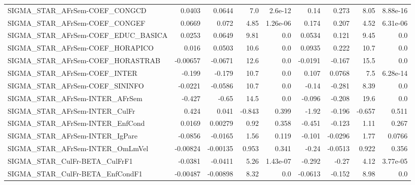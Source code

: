 \begin{tabular}{lrrrrrrrr}
SIGMA\_STAR\_AFrSem-COEF\_CONGCD         &      0.0403 &       0.0644 &     7.0 &  2.6e-12 &       0.14 &       0.273 &         8.05 &      8.88e-16 \\
SIGMA\_STAR\_AFrSem-COEF\_CONGEF         &      0.0669 &        0.072 &    4.85 & 1.26e-06 &      0.174 &       0.207 &         4.52 &      6.31e-06 \\
SIGMA\_STAR\_AFrSem-COEF\_EDUC\_BASICA    &      0.0253 &       0.0649 &    9.81 &      0.0 &     0.0534 &       0.121 &         9.45 &           0.0 \\
SIGMA\_STAR\_AFrSem-COEF\_HORAPICO       &       0.016 &       0.0503 &    10.6 &      0.0 &     0.0935 &       0.222 &         10.7 &           0.0 \\
SIGMA\_STAR\_AFrSem-COEF\_HORASTRAB      &    -0.00657 &      -0.0671 &    12.6 &      0.0 &    -0.0191 &      -0.167 &         15.5 &           0.0 \\
SIGMA\_STAR\_AFrSem-COEF\_INTER          &      -0.199 &       -0.179 &    10.7 &      0.0 &      0.107 &      0.0768 &          7.5 &      6.28e-14 \\
SIGMA\_STAR\_AFrSem-COEF\_SININFO        &     -0.0221 &      -0.0586 &    10.7 &      0.0 &      -0.14 &      -0.281 &         8.39 &           0.0 \\
SIGMA\_STAR\_AFrSem-INTER\_AFrSem        &      -0.427 &        -0.65 &    14.5 &      0.0 &     -0.096 &      -0.208 &         19.6 &           0.0 \\
SIGMA\_STAR\_AFrSem-INTER\_CulFr         &       0.424 &        0.041 &  -0.843 &    0.399 &      -1.92 &      -0.196 &       -0.657 &         0.511 \\
SIGMA\_STAR\_AFrSem-INTER\_EnfCond       &      0.0169 &      0.00279 &    0.92 &    0.358 &     -0.451 &      -0.123 &         1.11 &         0.267 \\
SIGMA\_STAR\_AFrSem-INTER\_IgPare        &     -0.0856 &      -0.0165 &    1.56 &    0.119 &     -0.101 &     -0.0296 &         1.77 &        0.0766 \\
SIGMA\_STAR\_AFrSem-INTER\_OmLmVel       &    -0.00824 &     -0.00135 &   0.953 &    0.341 &      -0.24 &     -0.0513 &        0.922 &         0.356 \\
SIGMA\_STAR\_CulFr-BETA\_CulFrF1         &     -0.0381 &      -0.0411 &    5.26 & 1.43e-07 &     -0.292 &       -0.27 &         4.12 &      3.77e-05 \\
SIGMA\_STAR\_CulFr-BETA\_EnfCondF1       &    -0.00487 &     -0.00898 &    8.32 &      0.0 &    -0.0613 &      -0.152 &         8.98 &           0.0 \\

\end{tabular}
